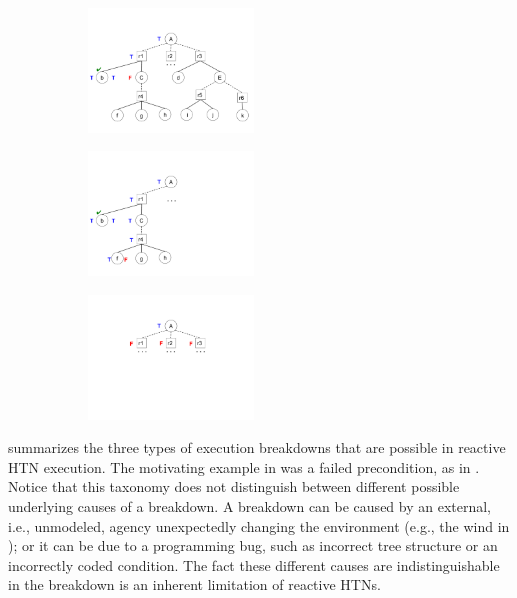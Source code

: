 \documentclass{llncs}
\begin{document}
\begin{figure}[t]
\centering
\begin{subfigure}{2.1in}
\centerline{\includegraphics[height=1.3in]{figs/precondition}}
\vskip 8pt 
\end{subfigure}
\hfill
\begin{subfigure}{1.4in}
\centerline{\includegraphics[height=1.3in]{figs/postcondition}}
\vskip 8pt 
\end{subfigure}
\hfill
\begin{subfigure}{1in}
\centerline{\includegraphics[height=1.3in]{figs/applicability}}
\vskip -2pt
\end{subfigure}
\vskip 4pt 
\end{figure}

 summarizes the three types of execution breakdowns
that are possible in reactive HTN execution.  The motivating example
in  was a failed precondition, as in
.  Notice that this taxonomy does not distinguish
between different possible underlying causes of a breakdown.  A
breakdown can be caused by an external, i.e., unmodeled, agency
unexpectedly changing the environment (e.g., the wind in
); or it can be due to a programming bug, such as
incorrect tree structure or an incorrectly coded condition.  The fact
these different causes are indistinguishable in the breakdown is
an inherent limitation of reactive HTNs.
\end{document}
